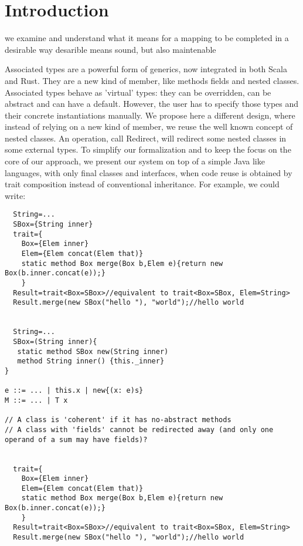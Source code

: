 \section{Introduction}

\Q@here@ we examine and understand what it means for a mapping to be completed in a desirable way
desarible means sound, but also maintenable

Associated types are a powerful form of generics, now integrated in both Scala and Rust.
They are a new kind of member, like methods fields and nested classes.
Associated types behave as 'virtual' types: they can be overridden, can be abstract and can have
a default.
However, the user has to specify those types and their concrete instantiations manually.
We propose here a different design, where instead of relying on a new kind of member, we reuse the well
known concept of nested classes. An operation, call Redirect, will redirect some nested classes in some external types.
To simplify our formalization and to keep the focus on the core of our approach, we 
present our system on top of a simple 
Java like languages, with only final classes and interfaces, when code reuse is obtained by
trait composition instead of conventional inheritance. 
For example, we could write:
\begin{lstlisting}
  String=...
  SBox={String inner}
  trait={
    Box={Elem inner}
    Elem={Elem concat(Elem that)}
    static method Box merge(Box b,Elem e){return new Box(b.inner.concat(e));}
    }
  Result=trait<Box=SBox>//equivalent to trait<Box=SBox, Elem=String>
  Result.merge(new SBox("hello "), "world");//hello world


  String=...
  SBox=(String inner){
   static method SBox new(String inner)
   method String inner() {this._inner}
}

e ::= ... | this.x | new{(x: e)s}
M ::= ... | T x

// A class is 'coherent' if it has no-abstract methods
// A class with 'fields' cannot be redirected away (and only one operand of a sum may have fields)?


  trait={
    Box={Elem inner}
    Elem={Elem concat(Elem that)}
    static method Box merge(Box b,Elem e){return new Box(b.inner.concat(e));}
    }
  Result=trait<Box=SBox>//equivalent to trait<Box=SBox, Elem=String>
  Result.merge(new SBox("hello "), "world");//hello world


\end{lstlisting}
